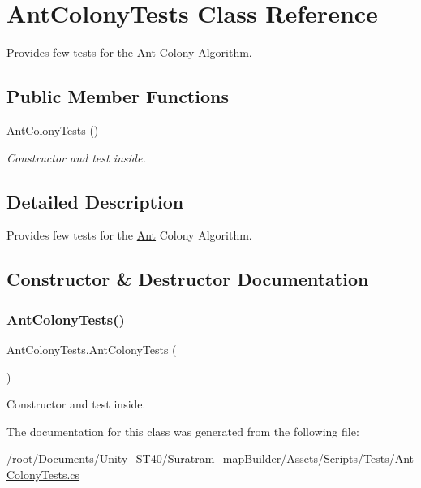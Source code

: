 \hypertarget{classAntColonyTests}{}\section{Ant\+Colony\+Tests Class Reference}
\label{classAntColonyTests}


Provides few tests for the \hyperlink{classAnt}{Ant} Colony Algorithm.  


\subsection*{Public Member Functions}
\begin{DoxyCompactItemize}
\item 
\hyperlink{classAntColonyTests_a6f4797b66a98bba954ac3f4e6f4bbbb1}{Ant\+Colony\+Tests} ()
\begin{DoxyCompactList}\small\item\em Constructor and test inside. \end{DoxyCompactList}\end{DoxyCompactItemize}


\subsection{Detailed Description}
Provides few tests for the \hyperlink{classAnt}{Ant} Colony Algorithm. 



\subsection{Constructor \& Destructor Documentation}
\mbox{\label{classAntColonyTests_a6f4797b66a98bba954ac3f4e6f4bbbb1}} 
\subsubsection{\texorpdfstring{Ant\+Colony\+Tests()}{AntColonyTests()}}
{\footnotesize\ttfamily Ant\+Colony\+Tests.\+Ant\+Colony\+Tests (\begin{DoxyParamCaption}{ }\end{DoxyParamCaption})\hspace{0.3cm}{\ttfamily [inline]}}



Constructor and test inside. 



The documentation for this class was generated from the following file\+:\begin{DoxyCompactItemize}
\item 
/root/\+Documents/\+Unity\+\_\+\+S\+T40/\+Suratram\+\_\+map\+Builder/\+Assets/\+Scripts/\+Tests/\hyperlink{AntColonyTests_8cs}{Ant\+Colony\+Tests.\+cs}\end{DoxyCompactItemize}
